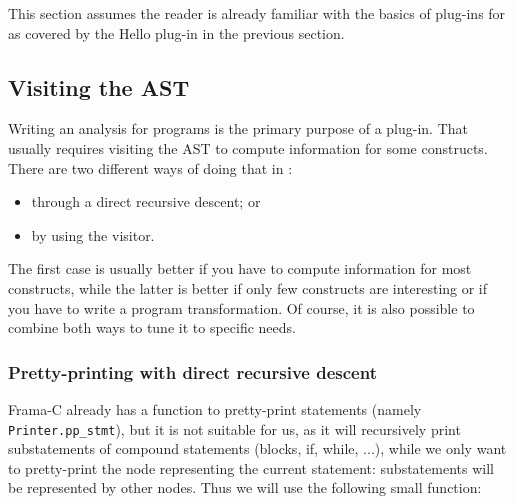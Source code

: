 This section assumes the reader is already familiar with the basics of plug-ins
for \framac as covered by the Hello plug-in in the previous
section.

\subsection{Visiting the AST}\label{tut2:visitor}

Writing an analysis for \C programs is the primary purpose of a \framac
plug-in. That usually requires visiting the AST to compute information for some
\C constructs. There are two different ways of doing that in \framac:
\begin{itemize}
\item through a direct recursive descent; or
\item by using the \framac visitor.
\end{itemize}
The first case is usually better if you have to compute information for most \C
constructs, while the latter is better if only few \C constructs are interesting
or if you have to write a program transformation. Of course, it is also possible
to combine both ways to tune it to specific needs.

\subsubsection*{Pretty-printing with direct recursive descent}

Frama-C already has a function to pretty-print statements (namely
\texttt{Printer.pp\_stmt}), but it is not
suitable for us, as it will recursively print substatements of compound
statements (blocks, if, while, ...), while we only want to pretty-print
the node representing the current statement: substatements will be represented
by other nodes. Thus we will use the following small function:

